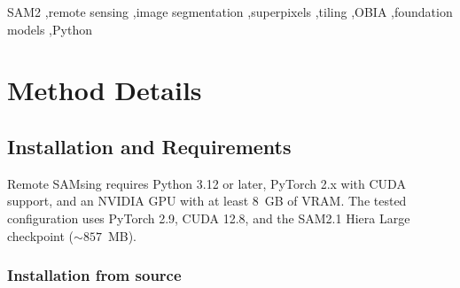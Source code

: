 \documentclass[review,11pt,authoryear]{elsarticle}
\begin{document}
\begin{frontmatter}
\begin{abstract}
Remote SAMsing exposes a single main configuration parameter---tile size---that functions as an implicit scale parameter: smaller tiles magnify objects in SAM2's internal resolution, improving detection of small features such as cars and narrow walkways. The companion paper \citep{carvalho2026jag} provides a full scientific evaluation on seven scenes spanning 5~cm to 4.78~m ground sampling distance, demonstrating 91--98\% coverage, Det@0.5 of 62--96\%, and Boundary IoU 3--8$\times$ higher than SLIC and Felzenszwalb baselines. A scalability test on a $36{,}000 \times 54{,}000$ pixel mosaic (1.94 billion pixels) produced 124{,}180 segments at 97\% coverage.

Source code: \url{https://github.com/osmarluiz/sam-mosaic}
\end{abstract}

\begin{keyword}
SAM2 \sep remote sensing \sep image segmentation \sep superpixels \sep tiling \sep OBIA \sep foundation models \sep Python
\end{keyword}

\end{frontmatter}

\linenumbers


\section{Method Details}
\label{sec:method}

\subsection{Installation and Requirements}
\label{sec:install}

Remote SAMsing requires Python 3.12 or later, PyTorch 2.x with CUDA support, and an NVIDIA GPU with at least 8~GB of VRAM. The tested configuration uses PyTorch 2.9, CUDA 12.8, and the SAM2.1 Hiera Large checkpoint (${\sim}857$~MB).

\subsubsection{Installation from source}
\end{document}
